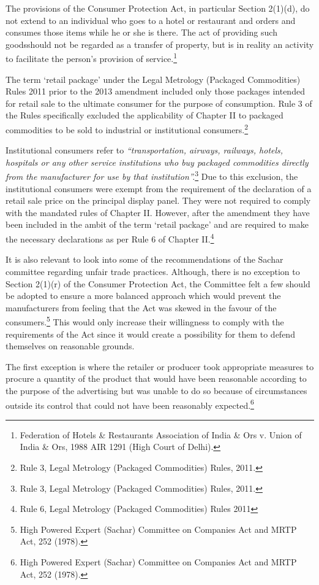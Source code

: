 \begin{multicols}{2}
\noi
The provisions of the Consumer Protection Act, in particular Section 2(1)(d), do not extend to
an individual who goes to a hotel or restaurant and orders and consumes those items while he
or she is there. The act of providing such goodsshould not be regarded as a transfer of property,
but is in reality an activity to facilitate the person's provision of service.\footnote{Federation of Hotels \& Restaurants Association of India \& Ors v. Union of India \& Ors, 1988 AIR 1291 (High Court of Delhi).}

\noi
The term ‘retail package’ under the Legal Metrology (Packaged Commodities) Rules 2011
prior to the 2013 amendment included only those packages intended for retail sale to the
ultimate consumer for the purpose of consumption. Rule 3 of the Rules specifically excluded
the applicability of Chapter II to packaged commodities to be sold to industrial or institutional
consumers.\footnote{Rule 3, Legal Metrology (Packaged Commodities) Rules, 2011.}

\noi
Institutional consumers refer to \textit{“transportation, airways, railways, hotels, hospitals or any
other service institutions who buy packaged commodities directly from the manufacturer for
use by that institution”.}\footnote{Rule 3, Legal Metrology (Packaged Commodities) Rules, 2011.} Due to this exclusion, the institutional consumers were exempt from the requirement of the declaration of a retail sale price on the principal display panel. They were not required to comply with the mandated rules of Chapter II. However, after the amendment they have been included in the ambit of the term ‘retail package’ and are required to make the necessary declarations as per Rule 6 of Chapter II.\footnote{Rule 6, Legal Metrology (Packaged Commodities) Rules 2011}

\noi
It is also relevant to look into some of the recommendations of the Sachar committee regarding
unfair trade practices. Although, there is no exception to Section 2(1)(r) of the Consumer
Protection Act, the Committee felt a few should be adopted to ensure a more balanced approach
which would prevent the manufacturers from feeling that the Act was skewed in the favour of
the consumers.\footnote{High Powered Expert (Sachar) Committee on Companies Act and MRTP Act, 252 (1978).} This would only increase their willingness to comply with the requirements
of the Act since it would create a possibility for them to defend themselves on reasonable
grounds.

\noi
The first exception is where the retailer or producer took appropriate measures to procure a
quantity of the product that would have been reasonable according to the purpose of the
advertising but was unable to do so because of circumstances outside its control that could not
have been reasonably expected.\footnote{High Powered Expert (Sachar) Committee on Companies Act and MRTP Act, 252 (1978).}


\end{multicols}
